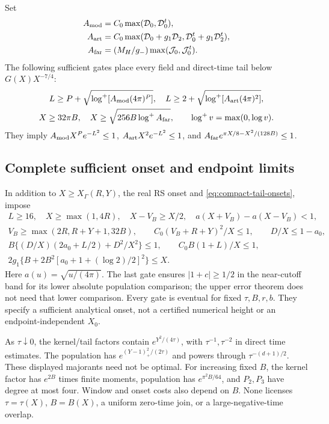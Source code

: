 \documentclass[11pt]{article}
\numberwithin{equation}{section}
\begin{document}
Set
\begin{align}
 A_{\rm mod}&=C_0\max(\mathcal D_0,\mathcal D_0^t),\\
 A_{\rm art}&=C_0\max(\mathcal D_0+g_1\mathcal D_2,
                       \mathcal D_0^t+g_1\mathcal D_2^t),\\
 A_{\rm far}&=(M_H/g_-)\max(\mathcal J_0,\mathcal J_0^t).
 \label{eq:compact-tail-absorption}
\end{align}
The following sufficient gates place every field and direct-time tail
below \(G(X)X^{-7/4}\):
\begin{gather}
 L\ge P+\sqrt{\log^+[A_{\rm mod}(4\pi)^P]},\quad
 L\ge2+\sqrt{\log^+[A_{\rm art}(4\pi)^2]},\\
 X\ge32\pi B,\quad X\ge\sqrt{256B\log^+A_{\rm far}},
 \qquad\log^+v=\max(0,\log v).
 \label{eq:compact-tail-onsets}
\end{gather}
They imply \(A_{\rm mod}X^Pe^{-L^2}\le1\),
\(A_{\rm art}X^2e^{-L^2}\le1\), and
\(A_{\rm far}e^{\pi X/8-X^2/(128B)}\le1\).

\subsection{Complete sufficient onset and endpoint limits}
In addition to \(X\ge X_\Gamma(R,Y)\), the real RS onset and
\eqref{eq:compact-tail-onsets}, impose
\begin{gather}
 L\ge16,\quad X\ge\max(1,4R),\quad X-V_B\ge X/2,\quad
 a(X+V_B)-a(X-V_B)<1,\\
 V_B\ge\max(2R,R+Y+1,32B),\qquad
 C_0(V_B+R+Y)^2/X\le1,\qquad D/X\le1-a_0,\\
 B\{(D/X)(2a_0+L/2)+D^2/X^2\}\le1,\qquad
 C_0B(1+L)/X\le1,\\
 2g_1\{B+2B^2[a_0+1+(\log2)/2]^2\}\le X.
 \label{eq:compact-local-onsets}
\end{gather}
Here \(a(u)=\sqrt{u/(4\pi)}\). The last gate ensures
\(|1+c|\ge1/2\) in the near-cutoff band for its lower absolute
population comparison; the upper error theorem does not need that
lower comparison. Every gate is eventual for fixed \(\tau,B,r,b\).
They specify a sufficient analytical onset, not a certified numerical
height or an endpoint-independent \(X_0\).

As \(\tau\downarrow0\), the kernel/tail factors contain
\(e^{Y^2/(4\tau)}\), with \(\tau^{-1},\tau^{-2}\) in direct
time estimates. The population has
\(e^{(Y-1)_+^2/(2\tau)}\) and powers through
\(\tau^{-(d+1)/2}\). These displayed majorants need not be optimal.
For increasing fixed \(B\), the kernel factor has \(e^{2B}\)
times finite moments, population has \(e^{\pi^2B/64}\), and
\(P_2,P_3\) have degree at most four. Window and onset costs also
depend on \(B\). None licenses \(\tau=\tau(X)\), \(B=B(X)\),
a uniform zero-time join, or a large-negative-time overlap.
\end{document}
